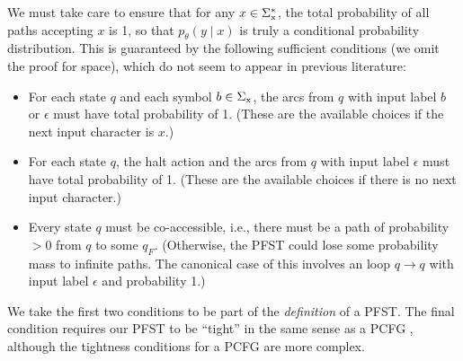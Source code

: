 \documentclass[11pt,letterpaper]{article}
\newcommand{\Sigmax}{\Sigma_{\text x}}
\newcommand{\ptheta}{{p_\theta}}
\newcommand{\ryan}[1]{\todo[color=green!40,author=Ryan]{#1}}
\newcommand{\jason}[1]{\todo[color=blue!40,author=Jason]{#1}}
\begin{document}
We must take care to ensure that for any $x \in \Sigmax^*$, the total probability of all paths accepting $x$ is 1, so that $\ptheta(y\mid x)$ is truly a conditional probability distribution.  This is guaranteed by the following sufficient conditions (we omit the proof for space), which do not seem to appear in previous literature:
\begin{itemize}
\item For each state $q$ and each symbol $b \in \Sigmax$, the arcs from $q$ with input label $b$ or $\epsilon$ must have total probability of 1.  (These are the available choices if the next input character is $x$.)
\item For each state $q$, the halt action and the arcs from $q$ with input label $\epsilon$ must have total probability of 1.  (These are the available choices if there is no next input character.)
\item Every state $q$ must be co-accessible, i.e., there must be a path of probability $> 0$ from $q$ to some $q_F$.  (Otherwise, the PFST could lose some probability mass to infinite paths.
The canonical case of this involves an loop $q \rightarrow q$ with input label $\epsilon$ and probability 1.)
\end{itemize}
We take the first two conditions to be part of the {\em definition} of a PFST.  The final condition requires our PFST to be ``tight'' in the same sense as a PCFG \cite{chi-geman-1998}, although the tightness conditions for a PCFG are more complex.  %
\end{document}
